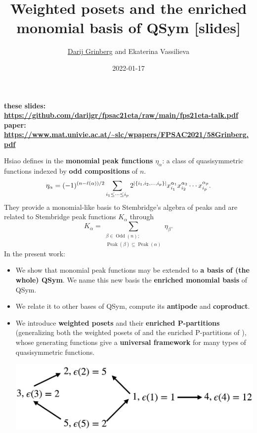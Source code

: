 \documentclass[numbers=enddot,12pt,final,onecolumn,notitlepage]{scrartcl}%
\newcommand{\al}{\alpha}
\newcommand{\Odd}{\operatorname{Odd}}
\newcommand{\Peak}{\operatorname{Peak}}
\newcommand{\0}{\phantom{c}}
\let\sumnonlimits\sum
\renewcommand{\sum}{\sumnonlimits\limits}
\begin{document}
\title{Weighted posets and the enriched monomial basis of QSym [slides]}
\author{\href{http://www.cip.ifi.lmu.de/~grinberg/}{Darij Grinberg} and Ekaterina Vassilieva}
\date{2022-01-17}
\maketitle

\noindent \textbf{these slides: \color{red}
\url{https://github.com/darijgr/fpsac21eta/raw/main/fps21eta-talk.pdf}}%
\newline\textbf{paper: \color{red}
\url{https://www.mat.univie.ac.at/~slc/wpapers/FPSAC2021/58Grinberg.pdf}}%
\newline

\begin{tcolorbox}[colback=cyan!5,colframe=cyan!75!black, fonttitle=\bfseries,title=Summary of our work] Hsiao defines in \cite{Hsi07} the \textbf{monomial peak functions} $\eta_{\al}$: a class of quasisymmetric functions indexed by \textbf{odd compositions} of $n$.
\begin{equation*}
\eta_{\al} = (-1)^{(n-\ell(\al))/2}\sum\limits_{\substack{i_1 \leq \dots \leq i_p}}2^{|\{i_1,i_2,\dots,i_p\}|} x_{i_1}^{\al_1}x_{i_2}^{\al_2} \cdots x_{i_p}^{\al_p}.
\end{equation*}
They provide a monomial-like basis to Stembridge's algebra of peaks \cite{Ste97} and are related to Stembridge peak functions $K_\al$ through
\begin{equation*}
K_{\al} = \sum_{{\substack{\beta \in \Odd(n);\\ \Peak(\beta) \subseteq \Peak(\al)}}} \eta_{\beta}.
\end{equation*}
In the present work: 
\begin{itemize}
\item We show that monomial peak functions may be extended to \textbf{a basis of (the whole) QSym}. We name this new basis the \textbf{enriched monomial basis} of QSym.
\item We relate it to other bases of QSym, compute its \textbf{antipode} and \textbf{coproduct}. 
\item We introduce \textbf{weighted posets} and their \textbf{enriched P-partitions} (generalizing both the weighted posets of 
\cite{Gri17} and the enriched P-partitions of \cite{Ste97}), whose generating functions give a \textbf{universal framework} for many types of quasisymmetric functions.

\begin{center}
\includegraphics[scale=0.16]{Poset.png}
\end{center}
 

\end{itemize}
\end{tcolorbox}
\end{document}

